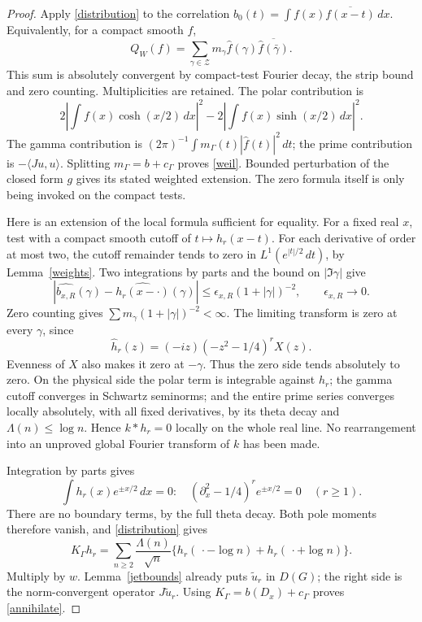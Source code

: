 \documentclass[11pt]{article}
\theoremstyle{remark}
\newcommand{\dd}{\,d}
\begin{document}
\begin{proof}
Apply \eqref{distribution} to the correlation
\(b_0(t)=\int f(x)\overline{f(x-t)}\dd x\).
Equivalently, for a compact smooth \(f\),
\[
 Q_W(f)=\sum_{\gamma\in\mathcal Z}m_\gamma
              \widehat f(\gamma)\overline{\widehat f(\bar\gamma)}.
\]
This sum is absolutely convergent by compact-test Fourier decay,
the strip bound and zero counting. Multiplicities are retained.
The polar contribution is
\[
 2\left|\int f(x)\cosh(x/2)\dd x\right|^2
       -2\left|\int f(x)\sinh(x/2)\dd x\right|^2.
\]
The gamma contribution is
\((2\pi)^{-1}\int m_\Gamma(t)|\widehat f(t)|^2\dd t\);
the prime contribution is \(-\langle Ju,u\rangle\).
Splitting \(m_\Gamma=b+c_\Gamma\) proves \eqref{weil}.
Bounded perturbation of the closed form \(g\) gives its stated
weighted extension. The zero formula itself is only being invoked
on the compact tests.

Here is an extension of the local formula sufficient for equality.
For a fixed real \(x\), test with a compact smooth cutoff of
\(t\mapsto h_r(x-t)\).
For each derivative of order at most two, the cutoff remainder
tends to zero in \(L^1(e^{|t|/2}\dd t)\), by Lemma~\ref{weights}.
Two integrations by parts and the bound on \(|\Im\gamma|\) give
\[
 |\widehat{b_{x,R}}(\gamma)-\widehat{h_r(x-\cdot)}(\gamma)|
       \le \epsilon_{x,R}(1+|\gamma|)^{-2},\qquad
                                      \epsilon_{x,R}\to0.
\]
Zero counting gives
\(\sum m_\gamma(1+|\gamma|)^{-2}<\infty\).
The limiting transform is zero at every \(\gamma\), since
\[
 \widehat h_r(z)=(-iz)(-z^2-1/4)^rX(z).
\]
Evenness of \(X\) also makes it zero at \(-\gamma\).
Thus the zero side tends absolutely to zero.
On the physical side the polar term is integrable against \(h_r\);
the gamma cutoff converges in Schwartz seminorms; and the entire
prime series converges locally absolutely, with all fixed derivatives,
by its theta decay and \(\Lambda(n)\le\log n\).
Hence \(k*h_r=0\) locally on the whole real line.
No rearrangement into an unproved global Fourier transform of \(k\)
has been made.

Integration by parts gives
\[
 \int h_r(x)e^{\pm x/2}\dd x=0:
 \quad(\partial_x^2-1/4)^r e^{\pm x/2}=0
                      \quad(r\ge1).
\]
There are no boundary terms, by the full theta decay.
Both pole moments therefore vanish, and \eqref{distribution} gives
\[
 K_\Gamma h_r
   =\sum_{n\ge2}\frac{\Lambda(n)}{\sqrt n}
                \{h_r(\,\cdot-\log n)+h_r(\,\cdot+\log n)\}.
\]
Multiply by \(w\). Lemma~\ref{jetbounds} already puts
\(\widetilde u_r\) in \(D(G)\); the right side is the norm-convergent
operator \(J\widetilde u_r\).
Using \(K_\Gamma=b(D_x)+c_\Gamma\) proves \eqref{annihilate}.
\end{proof}
\end{document}
